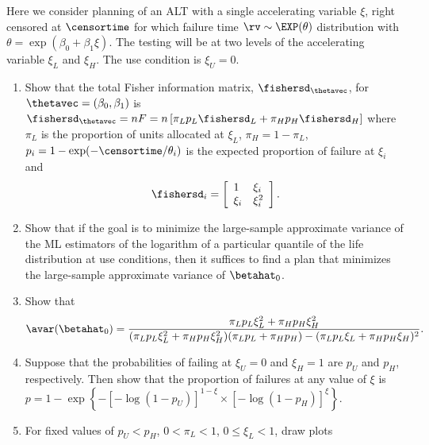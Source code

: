 \begin{exercise1}
Here we consider planning of an ALT with
a single accelerating variable $\xi$, right censored at
$\censortime$
for which failure time $\rv \sim \EXP(\theta)$ distribution with 
$\theta=\exp(\beta_{0}+\beta_{1} \xi)$.
The testing  will be at two levels of the accelerating variable $\xi_{L}$ and 
$\xi_{H}$. The use condition is $\xi_{U}=0$.
\begin{enumerate}
\item
Show that the total Fisher information
matrix, $\fishersd_{\thetavec}$, for $\thetavec=(\beta_{0},\beta_{1})$ is
$
\fishersd_{\thetavec}= n F=
n  \left [
 \pi_{L} p_{L} \fishersd_{L} +  \pi_{H} p_{H} \fishersd_{H}
   \right ]
$
where $\pi_{L}$ is the proportion of units allocated
at $\xi_{L}$, $\pi_{H}=1-\pi_{L}$, 
$p_{i}=1-\exp(-\censortime/\theta_{i})$
 is the expected
proportion of failure at $\xi_{i}$  and
\begin{displaymath}
\fishersd_{i}=
\left [
\begin{array}{ll}
1  & \xi_{i}
\\
 \xi_{i}        & \xi_{i}^{2}
\end{array}
\right ].
\end{displaymath}
\item
Show that if the goal is to minimize the large-sample approximate
variance of the ML estimators of the logarithm of a particular quantile
of the life distribution at use conditions, then it suffices
to find a plan that minimizes the large-sample approximate variance
of $\betahat_{0}$.
\item
Show that
\begin{displaymath}
\avar(\betahat_{0})=
\frac{
\pi_{L} p_{L} \xi_{L}^{2} + \pi_{H} p_{H}\xi_{H}^{2}
     }
     {
(\pi_{L} p_{L} \xi_{L}^{2} + \pi_{H} p_{H} \xi_{H}^{2})
(\pi_{L} p_{L} + \pi_{H} p_{H} )
-(\pi_{L} p_{L} \xi_{L}+\pi_{H} p_{H} \xi_{H})^{2}
     }.
\end{displaymath}
\item
Suppose that the probabilities of failing at $\xi_{U}=0$ and $\xi_{H}=1$ 
are $p_{U}$ 
and $p_{H}$, respectively. Then show that the proportion of failures at 
any value of $\xi$ is
$p=1-\exp \left \{-
 \left [-\log(1-p_{U}) \right ]^{1-\xi} \times \left [
 -\log(1-p_{H}) \right ]^{\xi}
        \right \}.
$
\item
For fixed values of 
$p_{U}< p_{H}$, $0<\pi_{L}<1$, $0\le \xi_{L}<1$, draw  plots

\end{enumerate}
\end{exercise1}
